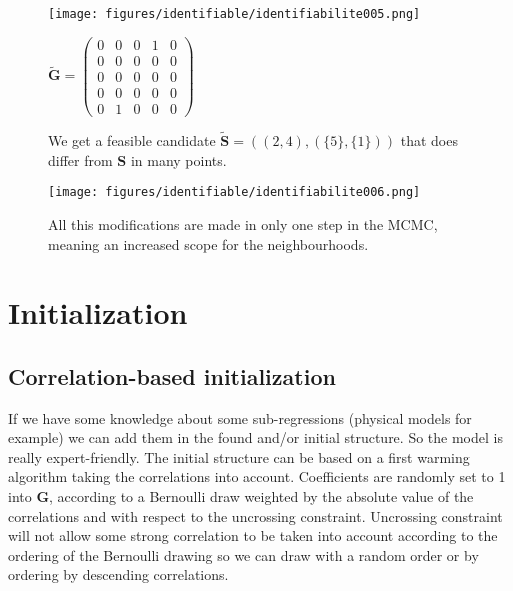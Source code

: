 \documentclass[12pt,a4paper]{report}
\begin{document}
\begin{figure}
	\begin{minipage}[c]{.45\linewidth}
\texttt{[image: figures/identifiable/identifiabilite005.png]} 
	\end{minipage}
	\begin{minipage}[c]{.45\linewidth}
		$\tilde{\boldsymbol{G}}=\left( \begin{array}{ccccc}
		0 & 0 & 0 & 1 & 0 \\ 
		0 &0 & 0 & 0 & 0 \\ 
		0 & 0 & 0 & 0 & 0 \\ 
		0 & 0 & 0 & 0 & 0 \\ 
		0 & 1& 0 & 0 & 0
		\end{array} \right)$
	\end{minipage}
	\caption{We get a feasible candidate $\tilde{\boldsymbol{S}}=((2,4),(\{5\},\{1\}))$ that does differ from $\boldsymbol{S}$ in many points. }\label{ident5}
\end{figure}

\begin{figure}
\centering
\texttt{[image: figures/identifiable/identifiabilite006.png]} 
	\caption{All this modifications are made in only one step in the MCMC, meaning an increased scope for the neighbourhoods.}\label{ident6}
\end{figure}

\FloatBarrier				
	\section{Initialization}
		\subsection{Correlation-based initialization}
		 If we have some knowledge about some sub-regressions (physical models for example) we can add them in the found and/or initial structure. So the model is really expert-friendly.
The initial structure can be based on a first warming algorithm taking the correlations into account. Coefficients are randomly set to 1 into $\boldsymbol{G}$, according to a Bernoulli draw weighted by the absolute value of the correlations and with respect to the uncrossing constraint. Uncrossing constraint will not allow some strong correlation to be taken into account according to the ordering of the Bernoulli drawing so we can draw with a random order or by ordering by descending correlations.\\
		
\end{document}
